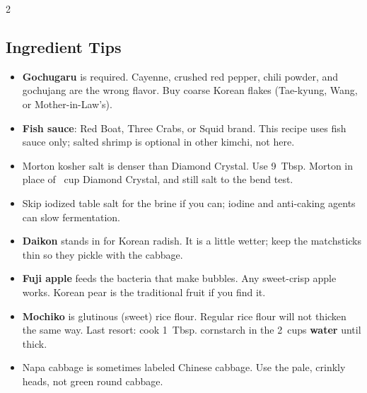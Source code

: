 \documentclass[11pt,letterpaper]{article}
\begin{document}
{\begin{multicols}{2}
\subsection*{Ingredient Tips}
\begin{itemize}
    \item \textbf{Gochugaru} is required. Cayenne, crushed red pepper, chili powder, and gochujang are the wrong flavor. Buy coarse Korean flakes (Tae-kyung, Wang, or Mother-in-Law's).
    \item \textbf{Fish sauce}: Red Boat, Three Crabs, or Squid brand. This recipe uses fish sauce only; salted shrimp is optional in other kimchi, not here.
    \item Morton kosher salt is denser than Diamond Crystal. Use 9~Tbsp. Morton in place of ~cup Diamond Crystal, and still salt to the bend test.
    \item Skip iodized table salt for the brine if you can; iodine and anti-caking agents can slow fermentation.
    \item \textbf{Daikon} stands in for Korean radish. It is a little wetter; keep the matchsticks thin so they pickle with the cabbage.
    \item \textbf{Fuji apple} feeds the bacteria that make bubbles. Any sweet-crisp apple works. Korean pear is the traditional fruit if you find it.
    \item \textbf{Mochiko} is glutinous (sweet) rice flour. Regular rice flour will not thicken the same way. Last resort: cook 1~Tbsp. cornstarch in the 2~cups \textbf{water} until thick.
    \item Napa cabbage is sometimes labeled Chinese cabbage. Use the pale, crinkly heads, not green round cabbage.
\end{itemize}


\end{multicols}}
\end{document}
